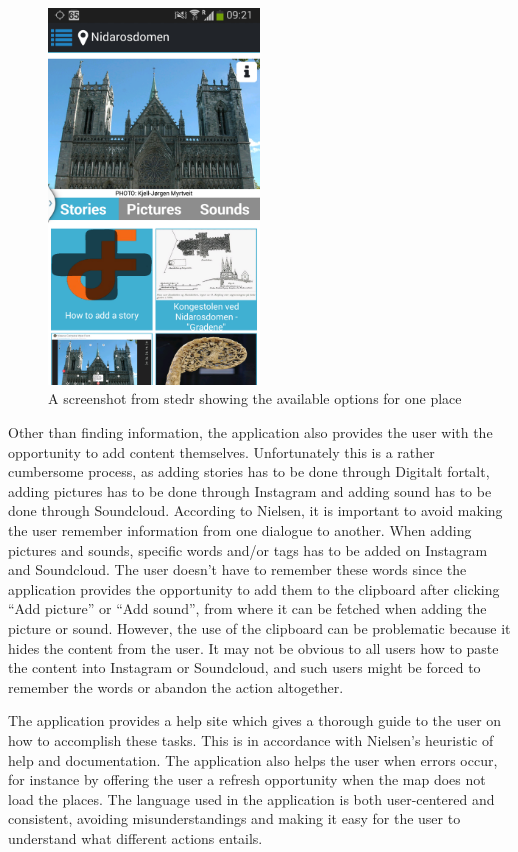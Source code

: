 \begin{figure}[h!]
	\centering
	\includegraphics[width=0.5\textwidth]{fig/stedr_screenshot}
	\caption{A screenshot from stedr showing the available options for one place}
	\label{stedr_screenshot}
\end{figure}

Other than finding information, the application also provides the user with the opportunity to add content themselves. Unfortunately this is a rather cumbersome process, as adding stories has to be done through Digitalt fortalt, adding pictures has to be done through Instagram and adding sound has to be done through Soundcloud. According to Nielsen, it is important to avoid making the user remember information from one dialogue to another. When adding pictures and sounds, specific words and/or tags has to be added on Instagram and Soundcloud. The user doesn’t have to remember these words since the application provides the opportunity to add them to the clipboard after clicking “Add picture” or “Add sound”, from where it can be fetched when adding the picture or sound. However, the use of the clipboard can be problematic because it hides the content from the user. It may not be obvious to all users how to paste the content into Instagram or Soundcloud, and such users might be forced to remember the words or abandon the action altogether. \newline

The application provides a help site which gives a thorough guide to the user on how to accomplish these tasks. This is in accordance with Nielsen’s heuristic of help and documentation. The application also helps the user when errors occur, for instance by offering the user a refresh opportunity when the map does not load the places. The language used in the application is both user-centered and consistent, avoiding misunderstandings and making it easy for the user to understand what different actions entails. \newline

